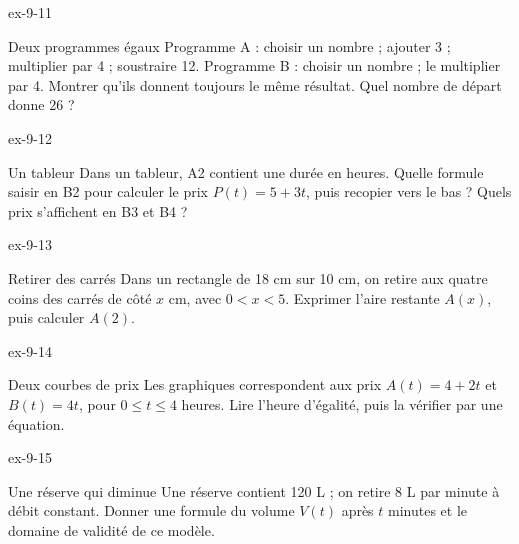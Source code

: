 \begin{blocLivre}{ex-9-11}\begin{exercice}[3]{Deux programmes égaux}
Programme A : choisir un nombre ; ajouter 3 ; multiplier par 4 ; soustraire 12. Programme B : choisir un nombre ; le multiplier par 4. Montrer qu’ils donnent toujours le même résultat. Quel nombre de départ donne 26 ?
\end{exercice}\end{blocLivre}
\begin{blocLivre}{ex-9-12}\begin{exercice}[3]{Un tableur}
Dans un tableur, A2 contient une durée en heures. Quelle formule saisir en B2 pour calculer le prix $P(t)=5+3t$, puis recopier vers le bas ? Quels prix s’affichent en B3 et B4 ?
\label{fig-ex-9-12}
\end{exercice}\end{blocLivre}
\begin{blocLivre}{ex-9-13}\begin{exercice}[3]{Retirer des carrés}
Dans un rectangle de 18 cm sur 10 cm, on retire aux quatre coins des carrés de côté $x$ cm, avec $0<x<5$. Exprimer l’aire restante $A(x)$, puis calculer $A(2)$.
\label{fig-ex-9-13}
\end{exercice}\end{blocLivre}
\begin{blocLivre}{ex-9-14}\begin{exercice}[3]{Deux courbes de prix}
Les graphiques correspondent aux prix $A(t)=4+2t$ et $B(t)=4t$, pour $0\le t\le4$ heures. Lire l’heure d’égalité, puis la vérifier par une équation.
\label{fig-ex-9-14}
\end{exercice}\end{blocLivre}
\begin{blocLivre}{ex-9-15}\begin{exercice}[3]{Une réserve qui diminue}
Une réserve contient 120 L ; on retire 8 L par minute à débit constant. Donner une formule du volume $V(t)$ après $t$ minutes et le domaine de validité de ce modèle.
\label{fig-ex-9-15}
\end{exercice}\end{blocLivre}

\clearpage

